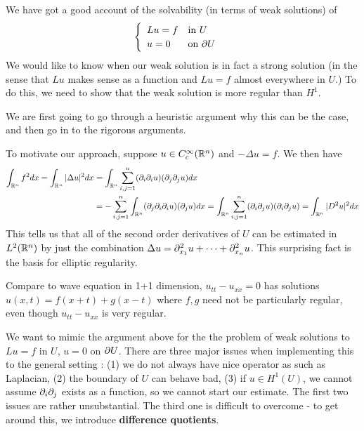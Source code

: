 \documentclass[12pt,a4paper]{report}
\begin{document}
We have got a good account of the solvability (in terms of weak solutions) of
\begin{align*}
\begin{cases}
\begin{array}{ll}
Lu =f & \text{in } U \\
u = 0 & \text{on } \partial U
\end{array}
\end{cases}
\end{align*}
We would like to know when our weak solution is in fact a strong solution (in the sense that $Lu$ makes sense as a function and $Lu =f$ almost everywhere in $U$.) To do this, we need to show that the weak solution is more regular than $H^1$.
\s

We are first going to go through a heuristic argument why this can be the case, and then go in to the rigorous arguments.

\quad To motivate our approach, suppose $u \in C_c^{\infty}(\mathbb{R}^n)$ and $-\Delta u =f$. We then have
\begin{align*}
\int_{\mathbb{R}^n} f^2 dx = \int_{\mathbb{R}^n} |\Delta u|^2 dx &= \int_{\mathbb{R}^n} \sum_{i,j=1}^n (\partial_i \partial_i u) (\partial_j \partial_j u) dx \\
&= -\sum_{i,j=1}^n \int_{\mathbb{R}^n} (\partial_j \partial_i \partial_i u) (\partial_j u) dx = \int_{\mathbb{R}^n} \sum_{i,j=1}^n (\partial_i \partial_j u) (\partial_i \partial_j u) = \int_{\mathbb{R}^n} |D^2 u|^2 dx
\end{align*}
This tells us that all of the second order derivatives of $U$ can be estimated in $L^2(\mathbb{R}^n)$ by just the combination $\Delta u = \partial_{x_1}^2 u + \cdots + \partial_{x_n}^2 u$. This surprising fact is the basis for elliptic regularity. 

\quad Compare to wave equation in 1+1 dimension, $u_{tt} - u_{xx} =0$ has solutions $u(x,t) = f(x+t) + g(x-t)$ where $f,g$ need not be particularly regular, even though $u_{tt} - u_{xx}$ is very regular.
\s

We want to mimic the argument above for the the problem of weak solutions to $Lu =f$ in $U$, $u=0$ on $\partial U$. There are three major issues when implementing this to the general setting : (1) we do not always have nice operator as such as Laplacian, (2) the boundary of $U$ can behave bad, (3) if $u\in H^1(U)$, we cannot assume $\partial_i \partial_j$ exists as a function, so we cannot start our estimate. The first two issues are rather unsubstantial. The third one is difficult to overcome - to get around this, we introduce \textbf{difference quotients}.
\s
\end{document}
